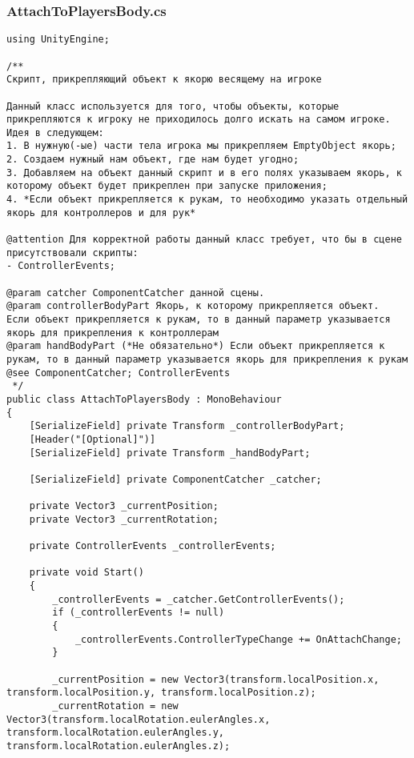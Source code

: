 \subsubsection*{AttachToPlayersBody.cs}
\begin{verbatim}
﻿using UnityEngine;

/**
Скрипт, прикрепляющий объект к якорю весящему на игроке

Данный класс используется для того, чтобы объекты, которые прикрепляются к игроку не приходилось долго искать на самом игроке. 
Идея в следующем: 
1. В нужную(-ые) части тела игрока мы прикрепляем EmptyObject якорь;
2. Создаем нужный нам объект, где нам будет угодно;
3. Добавляем на объект данный скрипт и в его полях указываем якорь, к которому объект будет прикреплен при запуске приложения;
4. *Если объект прикрепляется к рукам, то необходимо указать отдельный якорь для контроллеров и для рук*

@attention Для корректной работы данный класс требует, что бы в сцене присутствовали скрипты:
- ControllerEvents;

@param catcher ComponentCatcher данной сцены.
@param controllerBodyPart Якорь, к которому прикрепляется объект. 
Если объект прикрепляется к рукам, то в данный параметр указывается якорь для прикрепления к контроллерам
@param handBodyPart (*Не обязательно*) Если объект прикрепляется к рукам, то в данный параметр указывается якорь для прикрепления к рукам
@see ComponentCatcher; ControllerEvents
 */
public class AttachToPlayersBody : MonoBehaviour
{
    [SerializeField] private Transform _controllerBodyPart;
    [Header("[Optional]")]
    [SerializeField] private Transform _handBodyPart;

    [SerializeField] private ComponentCatcher _catcher;

    private Vector3 _currentPosition;
    private Vector3 _currentRotation;

    private ControllerEvents _controllerEvents;

    private void Start()
    {
        _controllerEvents = _catcher.GetControllerEvents();
        if (_controllerEvents != null)
        {
            _controllerEvents.ControllerTypeChange += OnAttachChange;
        }

        _currentPosition = new Vector3(transform.localPosition.x, transform.localPosition.y, transform.localPosition.z);
        _currentRotation = new Vector3(transform.localRotation.eulerAngles.x, transform.localRotation.eulerAngles.y, transform.localRotation.eulerAngles.z);


\end{verbatim}
